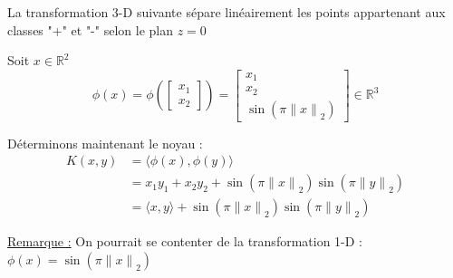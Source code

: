 {\begin{enumerate}
{\begin{figure}[H]
		                  \caption{}
		                  \label{12}
	                  \end{figure}}

	                  \begin{reponse}

		                  La transformation 3-D suivante sépare linéairement les points appartenant aux classes "+" et "-" selon le plan $z=0$

		                  Soit $x\in \mathbb{R}^2$
		                  \begin{equation*}
			                  \phi\left(x\right)
			                  = \phi\left( \begin{bmatrix}
					                  x_1 \\
					                  x_2\end{bmatrix}\right) = \begin{bmatrix}
				                  x_1 \\
				                  x_2 \\
				                  \sin\left(\pi {\lVert x \rVert}_2 \right)\end{bmatrix} \in \mathbb{R}^3
		                  \end{equation*}

		                  Déterminons maintenant le noyau :
		                  \begin{align*}
			                  K(x, y)
			                   & = \langle\phi(x),\phi(y)\rangle                                                                       \\
			                   & = x_1 y_1 + x_2 y_2 + \sin\left(\pi{\lVert x \rVert}_2\right)\sin\left(\pi{\lVert y \rVert}_2\right)  \\
			                   & = \langle x,y\rangle + \sin\left(\pi{\lVert x \rVert}_2\right)\sin\left(\pi{\lVert y \rVert}_2\right)
		                  \end{align*}

		                  \underline{Remarque :} On pourrait se contenter de la transformation 1-D : $\phi\left(x\right) = \sin\left(\pi {\lVert x \rVert}_2 \right)$
	                  \end{reponse}

            \end{enumerate}
      }
